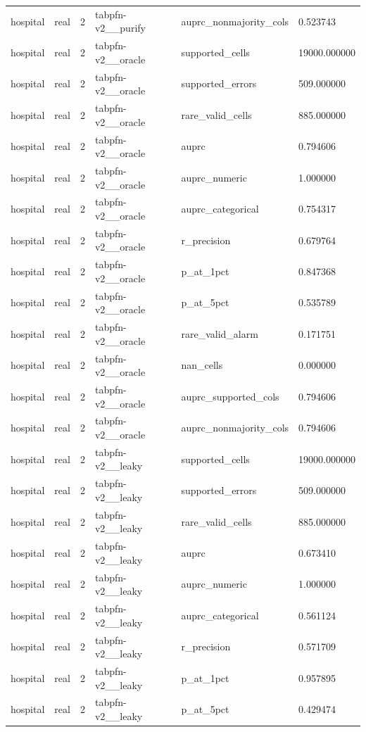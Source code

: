 \begin{tabular}{llllll}
hospital & real & 2 & tabpfn-v2\_\_purify & auprc\_nonmajority\_cols & 0.523743 \\
hospital & real & 2 & tabpfn-v2\_\_oracle & supported\_cells & 19000.000000 \\
hospital & real & 2 & tabpfn-v2\_\_oracle & supported\_errors & 509.000000 \\
hospital & real & 2 & tabpfn-v2\_\_oracle & rare\_valid\_cells & 885.000000 \\
hospital & real & 2 & tabpfn-v2\_\_oracle & auprc & 0.794606 \\
hospital & real & 2 & tabpfn-v2\_\_oracle & auprc\_numeric & 1.000000 \\
hospital & real & 2 & tabpfn-v2\_\_oracle & auprc\_categorical & 0.754317 \\
hospital & real & 2 & tabpfn-v2\_\_oracle & r\_precision & 0.679764 \\
hospital & real & 2 & tabpfn-v2\_\_oracle & p\_at\_1pct & 0.847368 \\
hospital & real & 2 & tabpfn-v2\_\_oracle & p\_at\_5pct & 0.535789 \\
hospital & real & 2 & tabpfn-v2\_\_oracle & rare\_valid\_alarm & 0.171751 \\
hospital & real & 2 & tabpfn-v2\_\_oracle & nan\_cells & 0.000000 \\
hospital & real & 2 & tabpfn-v2\_\_oracle & auprc\_supported\_cols & 0.794606 \\
hospital & real & 2 & tabpfn-v2\_\_oracle & auprc\_nonmajority\_cols & 0.794606 \\
hospital & real & 2 & tabpfn-v2\_\_leaky & supported\_cells & 19000.000000 \\
hospital & real & 2 & tabpfn-v2\_\_leaky & supported\_errors & 509.000000 \\
hospital & real & 2 & tabpfn-v2\_\_leaky & rare\_valid\_cells & 885.000000 \\
hospital & real & 2 & tabpfn-v2\_\_leaky & auprc & 0.673410 \\
hospital & real & 2 & tabpfn-v2\_\_leaky & auprc\_numeric & 1.000000 \\
hospital & real & 2 & tabpfn-v2\_\_leaky & auprc\_categorical & 0.561124 \\
hospital & real & 2 & tabpfn-v2\_\_leaky & r\_precision & 0.571709 \\
hospital & real & 2 & tabpfn-v2\_\_leaky & p\_at\_1pct & 0.957895 \\
hospital & real & 2 & tabpfn-v2\_\_leaky & p\_at\_5pct & 0.429474 \\

\end{tabular}
